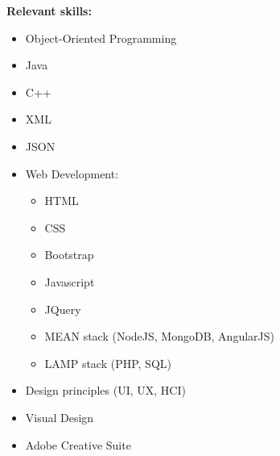 \documentclass[12pt,a4paper]{article}
\begin{document}
		\parbox{\textwidth}{		
			\textbf{\small Relevant skills:}
			\begin{itemize}\itemsep0em
				\item Object-Oriented Programming
				\item Java
				\item C++
				\item XML
				\item JSON
				\item Web Development:
				\begin {itemize}\itemsep0em
					\item HTML
					\item CSS
					\item Bootstrap
					\item Javascript
					\item JQuery
					\item MEAN stack (NodeJS, MongoDB, AngularJS)
					\item LAMP stack (PHP, SQL)
				\end {itemize}
				\item Design principles (UI, UX, HCI)
				\item Visual Design
				\item Adobe Creative Suite

			\end{itemize}
		}
		
\end{document}
